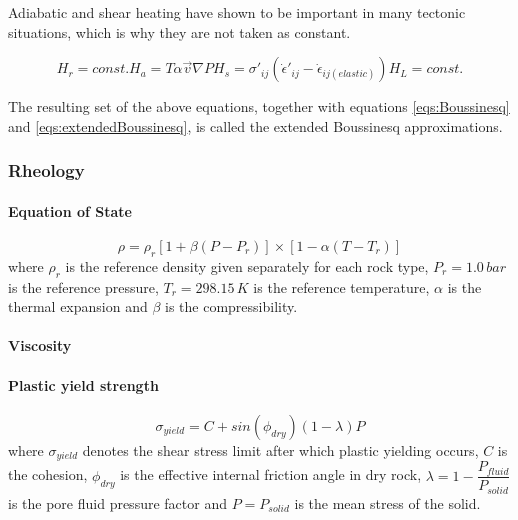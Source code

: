 Adiabatic and shear heating have shown to be important in many tectonic situations, which is why they are not taken as constant.

\begin{subequations}\label{eqs:extendedBoussinesq}
\begin{equation}
H_r = const.
\end{equation}
\begin{equation}
H_a = T \alpha \vec{v} \nabla P
\end{equation}
\begin{equation}
H_s = \sigma'_{ij} \left(\dot{\epsilon}'_{ij} - \dot{\epsilon}_{ij(elastic)} \right)
\end{equation}
\begin{equation}
H_L = const.
\end{equation}
\end{subequations}

The resulting set of the above equations, together with equations \eqref{eqs:Boussinesq} and \eqref{eqs:extendedBoussinesq}, is called the extended Boussinesq approximations.

\subsubsection{Rheology}

\paragraph{Equation of State}
\begin{equation}\label{eqs:EOS}
\rho = \rho_r  \left[ 1 + \beta \left( P - P_r \right) \right] \times \left[ 1 - \alpha \left( T - T_r \right) \right]
\end{equation}
where $\rho_r$ is the reference density given separately for each rock type, $P_r=1.0\,bar$ is the reference pressure, $T_r=298.15\,K$ is the reference temperature, $\alpha$ is the thermal expansion and $\beta$ is the compressibility.

\paragraph{Viscosity}
\paragraph{Plastic yield strength}
\begin{equation}\label{eqs:mohr_coulomb}
\sigma_{yield} = C + sin(\phi_{dry})(1-\lambda) P
\end{equation}
where $\sigma_{yield}$ denotes the shear stress limit after which plastic yielding occurs, $C$ is the cohesion, $\phi_{dry}$ is the effective internal friction angle in dry rock, $\lambda=1-\dfrac{P_{fluid}}{P_{solid}}$ is the pore fluid pressure factor and $P=P_{solid}$ is the mean stress of the solid.

